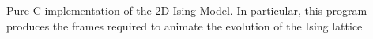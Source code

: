 Pure C implementation of the 2D Ising Model. In particular, this program produces the frames required to animate the evolution of the Ising lattice

 